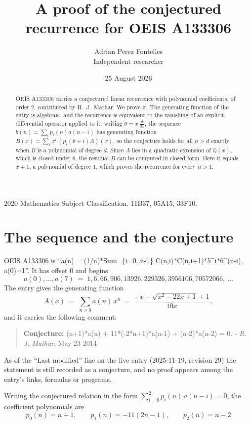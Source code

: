 \documentclass[11pt,a4paper]{article}
\title{A proof of the conjectured recurrence for OEIS A133306}
\author{Adrian Perez Fontelles\\ \small Independent researcher}
\date{25 August 2026}
\theoremstyle{plain}
\theoremstyle{definition}
\begin{document}
\maketitle

\begin{abstract}
OEIS A133306 carries a conjectured linear recurrence with polynomial coefficients, of
order 2, contributed by R.~J.~Mathar. We prove it. The generating function of the
entry is algebraic, and the recurrence is equivalent to the vanishing of an explicit
differential operator applied to it: writing $\theta=x\,\frac{d}{dx}$, the sequence
$b(n)=\sum_{i}p_{i}(n)a(n-i)$ has generating function
$B(x)=\sum_{i}x^{i}\,(p_{i}(\theta+i)A)(x)$, so the conjecture holds for all $n>d$ exactly
when $B$ is a polynomial of degree $d$. Since $A$ lies in a quadratic extension of
$\mathbb{Q}(x)$, which is closed under $\theta$, the residual $B$ can be computed in
closed form. Here it equals $x + 1$, a polynomial of degree $1$, which proves
the recurrence for every $n>1$.
\end{abstract}

\noindent\small 2020 Mathematics Subject Classification. 11B37, 05A15, 33F10.\normalsize

\section{The sequence and the conjecture}

OEIS A133306 is ``a(n) = (1/n)*Sum\_\{i=0..n-1\} C(n,i)*C(n,i+1)*5\^{}i*6\^{}(n-i), a(0)=1''. It has offset $0$ and begins
\[
a(0),\dots,a(7)\;=\;1, 6, 66, 906, 13926, 229326, 3956106, 70572066,\ \dots
\]
The entry gives the generating function
\begin{equation}\label{eq:gf}
A(x)\;=\;\sum_{n\ge 0} a(n)\,x^{n}\;=\;\frac{- x - \sqrt{x^{2} - 22 x + 1} + 1}{10 x} ,
\end{equation}
and it carries the following comment:
\begin{quote}\small
\textbf{Conjecture:} (n+1)*a(n) + 11*(-2*n+1)*a(n-1) + (n-2)*a(n-2) = 0. - \emph{R. J. Mathar}, May 23 2014
\end{quote}
As of the ``Last modified'' line on the live entry (2025-11-19, revision 29) the
statement is still recorded as a conjecture, and no proof appears among the entry's links,
formulas or programs.

Writing the conjectured relation in the form $\sum_{i=0}^{2}p_{i}(n)\,a(n-i)=0$,
the coefficient polynomials are
\[
p_{0}(n)=n + 1,\qquad p_{1}(n)=- 11 \left(2 n - 1\right),\qquad p_{2}(n)=n - 2
\]
\end{document}
